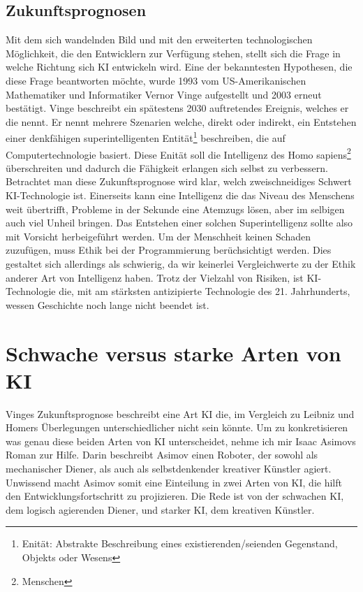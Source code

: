 \documentclass[12pt,german,ngerman]{report}
\begin{document}
    \section{Zukunftsprognosen}
        Mit dem sich wandelnden Bild und mit den erweiterten technologischen Möglichkeit, die den Entwicklern zur Verfügung stehen,
        stellt sich die Frage in welche Richtung sich KI entwickeln wird.
        Eine der bekanntesten Hypothesen, die diese Frage beantworten möchte, wurde 1993 vom US-Amerikanischen Mathematiker und 
        Informatiker Vernor Vinge aufgestellt und 2003
        erneut bestätigt. Vinge beschreibt ein spätestens 2030 auftretendes Ereignis, 
        welches er die \cite[1]{vinge1993technological} nennt. 
        Er nennt mehrere Szenarien welche, direkt oder indirekt, 
        ein Entstehen einer denkfähigen superintelligenten Entität\footnote{Enität: Abstrakte Beschreibung eines existierenden/seienden Gegenstand, Objekts oder Wesens}
        beschreiben, die auf Computertechnologie basiert.
        Diese Enität soll die Intelligenz des Homo sapiens\footnote{Menschen} überschreiten
        und dadurch die Fähigkeit erlangen sich selbst zu verbessern.\\

        Betrachtet man diese Zukunftsprognose wird klar, welch zweischneidiges Schwert
        KI-Technologie ist.
        Einerseits kann eine Intelligenz die das Niveau des Menschens weit übertrifft,
        Probleme in der Sekunde eine Atemzugs lösen, aber im selbigen auch viel Unheil bringen.
        Das Entstehen einer solchen Superintelligenz sollte also mit Vorsicht herbeigeführt werden.
        Um der Menschheit keinen Schaden zuzufügen, muss Ethik bei der Programmierung
        berüchsichtigt werden. Dies gestaltet sich allerdings als schwierig,
        da wir keinerlei Vergleichwerte zu der Ethik anderer Art von Intelligenz haben.
        Trotz der Vielzahl von Risiken, ist KI-Technologie die, mit am stärksten antizipierte Technologie des 21. Jahrhunderts,
        wessen Geschichte noch lange nicht beendet ist.


\chapter{Schwache versus starke Arten von KI}
    Vinges Zukunftsprognose\cite[1]{vinge1993technological} beschreibt eine Art KI die,
    im Vergleich zu Leibniz und Homers Überlegungen unterschiedlicher nicht sein könnte.
    Um zu konkretisieren was genau diese beiden Arten von KI unterscheidet, nehme ich
    mir Isaac Asimovs Roman  zur Hilfe.
    Darin beschreibt Asimov einen Roboter, der sowohl als mechanischer Diener, als
    auch als selbstdenkender kreativer Künstler agiert.\cite{asimov2000der}
    Unwissend macht Asimov somit eine Einteilung in zwei Arten von KI,
    die hilft den Entwicklungsfortschritt zu projizieren.
    Die Rede ist von der schwachen KI, dem logisch agierenden Diener, und
    starker KI, dem kreativen Künstler.
\end{document}
